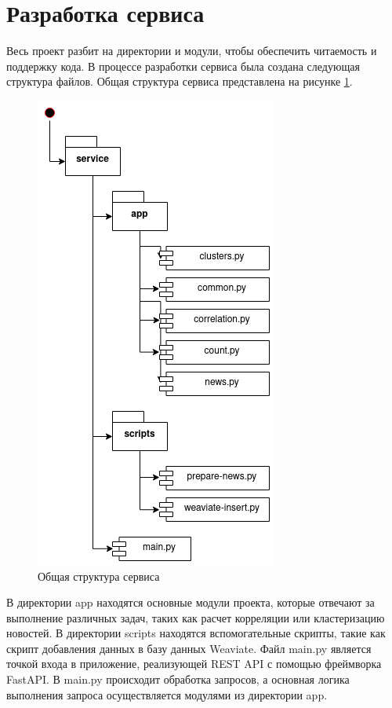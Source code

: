 \section{Разработка сервиса}

Весь проект разбит на директории и модули, чтобы обеспечить читаемость и поддержку кода. В процессе разработки сервиса была создана следующая структура файлов. Общая структура сервиса представлена на рисунке \ref{img:service-struct}.

\begin{figure}[h]
    \centering
    \includegraphics{images/service-struct.png}
    \caption{Общая структура сервиса}
    \label{img:service-struct}
\end{figure}

В директории app находятся основные модули проекта, которые отвечают за выполнение различных задач, таких как расчет корреляции или кластеризацию новостей. В директории scripts находятся вспомогательные скрипты, такие как скрипт добавления данных в базу данных Weaviate. Файл main.py является точкой входа в приложение, реализующей REST API с помощью фреймворка FastAPI. В main.py происходит обработка запросов, а основная логика выполнения запроса осуществляется модулями из директории app.

